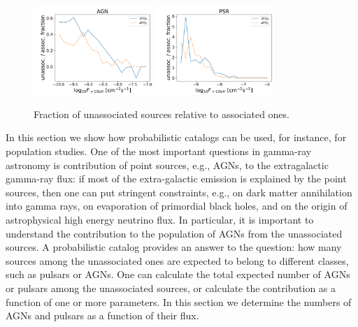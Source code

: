 \begin{figure}[h]
\includegraphics[width=0.4\textwidth]{plots/logN_logS_diff_AGN_unweighted.pdf}
\includegraphics[width=0.4\textwidth]{plots/logN_logS_diff_PSR_unweighted.pdf}
\caption{Fraction of unassociated sources relative to associated ones.}  
\label{fig:unass_vs_ass_frac}
\end{figure}



In this section we show how probabilistic catalogs can be used, for instance, for population studies.
One of the most important questions in gamma-ray astronomy is contribution of point sources, e.g., AGNs, to the extragalactic gamma-ray
flux:
if most of the extra-galactic emission is explained by the point sources, then one can put stringent constraints, e.g., on 
dark matter annihilation into gamma rays, on evaporation of primordial black holes, and on the origin of astrophysical high energy neutrino flux.
In particular, it is important to understand the contribution to the population of AGNs from the unassociated sources.
A probabilistic catalog provides an answer to the question: how many sources among the unassociated ones are expected to belong to different classes, such as pulsars or AGNs. 
One can calculate the total expected number of AGNs or pulsars among the unassociated sources, or calculate the contribution as a function of one or more parameters.
In this section we determine the numbers of AGNs and pulsars as a function of their flux.

